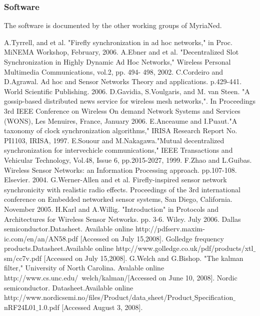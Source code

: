 \documentclass[a4paper,10pt]{report}
\begin{document}
\subsubsection{Software}
The software is documented by the other working groups of MyriaNed.
\begin{thebibliography}{\textbf{References}}
A.Tyrrell, and et al. "Firefly synchronization in ad hoc networks," in Proc. MiNEMA Workshop, February, 2006.
A.Ebner and et al. "Decentralized Slot Synchronization in Highly Dynamic Ad Hoc Networks," Wireless Personal Multimedia Communications, vol.2, pp. 494- 498, 2002.
C.Cordeiro and D.Agrawal. Ad hoc and Sensor Networks Theory and applications. p.429-441. World Scientific Publishing. 2006.
D.Gavidia, S.Voulgaris, and M. van Steen. "A gossip-based distributed news service for wireless mesh networks,". In Proceedings 3rd IEEE Conference on Wireless On demand Network Systems and Services (WONS), Les Menuires, France, January 2006.
E.Anceaume and I.Puaut."A taxonomy of clock synchronization algorithms," IRISA Research Report No. PI1103, IRISA, 1997.
E.Souour and M.Nakagawa."Mutual decentralized synchronization for intervechicle communications," IEEE Transactions and Vehicular Technology, Vol.48, Issue 6, pp.2015-2027, 1999.
F.Zhao and  L.Guibas. Wireless Sensor Networks: an Information Processing approach. pp.107-108. Elsevier. 2004.
G.Werner-Allen and et al. Firefly-inspired sensor network synchronicity with realistic radio effects. Proceedings of the 3rd international conference on Embedded networked sensor systems, San Diego, California. November 2005.
H.Karl and A.Willig. "Introduction" in Protocols and Architectures for Wireless Sensor Networks. pp. 3-6. Wiley. July 2006.
 Dallas semiconductor.Datasheet. Available online http:\slash \slash pdfserv.maxim-ic.com\slash en\slash an\slash AN58.pdf [Accessed on July 15,2008].
Golledge frequency products.Datasheet.Available online http:\slash \slash www.golledge.co.uk\slash pdf\slash products\slash xtl$\_$sm\slash cc7v.pdf [Accessed on July 15,2008].
G.Welch and G.Bishop. "The kalman filter," University of North Carolina. Avalable online http:\slash \slash www.cs.unc.edu\slash ~welch\slash kalman\slash  [Accessed on June 10, 2008].
Nordic semiconductor. Datasheet.Available online http:\slash \slash www.nordicsemi.no\slash files\slash Product\slash data$\_$sheet\slash Product$\_$Specification$\_$nRF24L01$\_$1.0.pdf [Accessed August 3, 2008].

\end{thebibliography}
\end{document}
